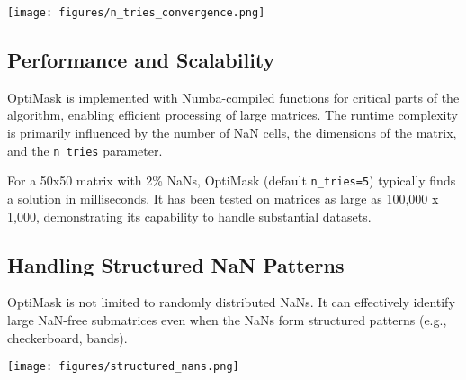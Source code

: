\documentclass[a0,landscape]{a0poster}
\begin{document}
\begin{multicols}{4}
	\begin{center}\vspace{0.5cm}
		\texttt{[image: figures/n\_tries\_convergence.png]} %
		\label{fig:n_tries}
	\end{center}\vspace{0.5cm}


	\color{SaddleBrown} %

	\subsection*{Performance and Scalability}
	OptiMask is implemented with Numba-compiled functions for critical parts of the algorithm, enabling efficient processing of large matrices. The runtime complexity is primarily influenced by the number of NaN cells, the dimensions of the matrix, and the \texttt{n\_tries} parameter.

	For a 50x50 matrix with 2\% NaNs, OptiMask (default \texttt{n\_tries=5}) typically finds a solution in milliseconds. It has been tested on matrices as large as 100,000 x 1,000, demonstrating its capability to handle substantial datasets.

	\subsection*{Handling Structured NaN Patterns}
	OptiMask is not limited to randomly distributed NaNs. It can effectively identify large NaN-free submatrices even when the NaNs form structured patterns (e.g., checkerboard, bands).

	\begin{center}\vspace{0.5cm}
		\texttt{[image: figures/structured\_nans.png]} %
		\label{fig:structured_nans}
	\end{center}\vspace{0.5cm}


\end{multicols}
\end{document}
